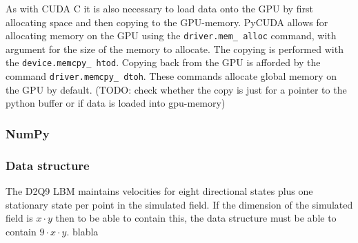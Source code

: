 As with CUDA C it is also necessary to load data onto the GPU by first allocating space and then copying to the GPU-memory. PyCUDA allows for allocating memory on the GPU using the \texttt{driver.mem\_ alloc} command, with argument for the size of the memory to allocate. The copying is performed with the \texttt{device.memcpy\_ htod}. Copying back from the GPU is afforded by the command \texttt{driver.memcpy\_ dtoh}. These commands allocate global memory on the GPU by default. (TODO: check whether the copy is just for a pointer to the python buffer or if data is loaded into gpu-memory)

\subsubsection{NumPy}

\subsubsection{Data structure}
The D2Q9 LBM maintains velocities for eight directional states plus one stationary state per point in the simulated field. If the dimension of the simulated field is $x \cdot y$ then to be able to contain this, the data structure must be able to contain $9 \cdot x \cdot y$. blabla